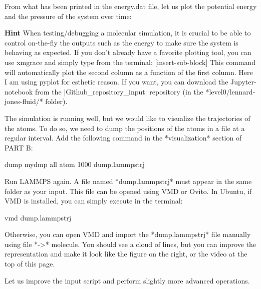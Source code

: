 From what has been printed in the energy.dat file, let us
plot the potential energy and the pressure of
the system over time:






\textbf{Hint} When testing/debugging a molecular simulation, it is crucial to be able to control 
on-the-fly the outputs such as the energy to make sure the
system is behaving as expected. If you don't already have 
a favorite plotting tool, you can use xmgrace and simply type from the terminal:
[insert-sub-block]
This command will automatically plot the second column as a function of the first column.
Here I am using pyplot for esthetic reason. If you want, you can download the Jupyter-notebook
from the |Github_repository_input| repository (in the *level0/lennard-jones-fluid/* folder).










The simulation is running well, but we would like to
visualize the trajectories of the atoms. To do so, we need
to dump the positions of the atoms in a file at a regular
interval. Add the following command in the *visualization*
section of PART B:



\begin{lcverbatim}
dump mydmp all atom 1000 dump.lammpstrj
\end{lcverbatim}

Run LAMMPS again. A file named *dump.lammpstrj* must appear in
the same folder as your input. This file can be opened using
VMD or Ovito. In Ubuntu, if VMD is installed, you can simply
execute in the terminal:



\begin{lcverbatim}
vmd dump.lammpstrj
\end{lcverbatim}

Otherwise, you can open VMD and import the *dump.lammpstrj*
file manually using file *->* molecule. You should see a cloud
of lines, but you can improve the representation and make it
look like the figure on the right, or the video at the 
top of this page. 






Let us improve the input script and perform slightly more
advanced operations.








